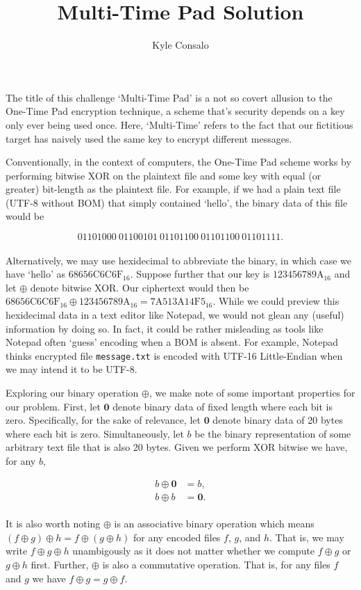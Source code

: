 \documentclass[12pt]{article}
\title{Multi-Time Pad Solution}
\author{Kyle Consalo}
\begin{document}
\newcommand{\sq}[1]{\lq #1\rq}
\maketitle
The title of this challenge \sq{Multi-Time Pad} is a not so covert allusion to the One-Time Pad encryption technique, a scheme that's security depends on a key only ever being used once. Here, \sq{Multi-Time} refers to the fact that our fictitious target has naively used the same key to encrypt different messages.

Conventionally, in the context of computers, the One-Time Pad scheme works by performing bitwise XOR on the plaintext file and some key with equal (or greater) bit-length as the plaintext file. For example, if we had a plain text file (UTF-8 without BOM) that simply contained \sq{hello}, the binary data of this file would be

$$01101000\ 01100101\ 01101100\ 01101100\ 01101111.$$
\\
Alternatively, we may use hexidecimal to abbreviate the binary, in which case we have \sq{hello} as $\mathrm{68656C6C6F}_{16}$. Suppose further that our key is $\mathrm{123456789A}_{16}$ and let $\oplus$ denote bitwise XOR. Our ciphertext would then be $\mathrm{68656C6C6F}_{16} \oplus \mathrm{123456789A}_{16} = \mathrm{7A513A14F5}_{16}$. While we could preview this hexidecimal data in a text editor like Notepad, we would not glean any (useful) information by doing so. In fact, it could be rather misleading as tools like Notepad often \sq{guess} encoding when a BOM is absent. For example, Notepad thinks encrypted file \texttt{message.txt} is encoded with UTF-16 Little-Endian when we may intend it to be UTF-8.

Exploring our binary operation $\oplus$, we make note of some important properties for our problem. First, let $\mathbf{0}$ denote binary data of fixed length where each bit is zero. Specifically, for the sake of relevance, let $\mathbf{0}$ denote binary data of 20 bytes where each bit is zero. Simultaneously, let $b$ be the binary representation of some arbitrary text file that is also 20 bytes. Given we perform XOR bitwise we have, for any $b$,

\begin{align*}
b \oplus \mathbf{0} &= b,\\
b \oplus b &= \mathbf{0}.
\end{align*}
\\
It is also worth noting $\oplus$ is an associative binary operation which means $( f \oplus g) \oplus h = f \oplus ( g \oplus h )$ for any encoded files $f$, $g$, and $h$. That is, we may write $f \oplus g \oplus  h$ unambigously as it does not matter whether we compute $f \oplus g$ or $g \oplus h$ first. Further, $\oplus$ is also a commutative operation. That is, for any files $f$ and $g$ we have $f \oplus g = g \oplus f$.
\end{document}
